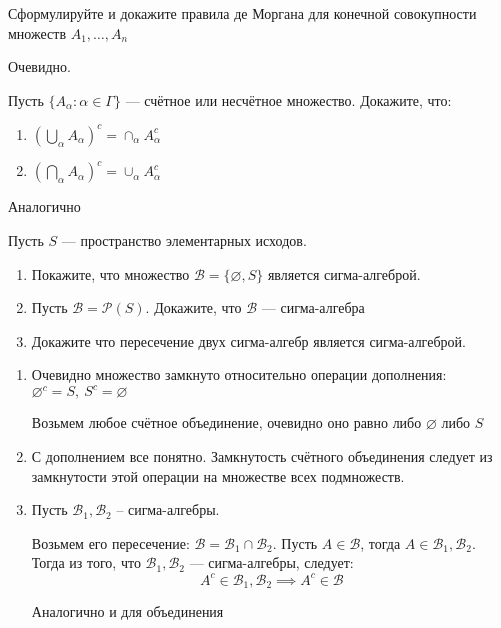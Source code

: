 \documentclass[document]{subfiles}
\begin{document}
\begin{problem}
    Сформулируйте и докажите правила де Моргана для конечной совокупности множеств $A_1, \dots, A_n$
\end{problem}
\begin{solution}
    Очевидно.
\end{solution}

\begin{problem}
    Пусть $\{A_\alpha : \alpha \in \Gamma\}$ --- счётное или несчётное множество. Докажите, что:
    \begin{enumerate}
        \item $(\bigcup_\alpha A_\alpha)^c = \cap_\alpha A^c_\alpha$
        \item $(\bigcap_\alpha A_\alpha)^c = \cup_\alpha A^c_\alpha$
    \end{enumerate}
\end{problem}
\begin{solution}
    Аналогично
\end{solution}

\begin{problem}
    Пусть $S$ --- пространство элементарных исходов.
    \begin{enumerate}
        \item Покажите, что множество $\mathcal{B} = \{\varnothing, S\}$ является сигма-алгеброй.
        \item Пусть $\mathcal{B} = \mathcal{P}(S)$. Докажите, что $\mathcal{B}$ --- сигма-алгебра
        \item Докажите что пересечение двух сигма-алгебр является сигма-алгеброй.
    \end{enumerate}
\end{problem}
\begin{solution}
    \begin{enumerate}
          \item Очевидно множество замкнуто относительно операции дополнения: $\varnothing^c = S, ~ S^c = \varnothing$ 
               
              Возьмем любое счётное объединение, очевидно оно равно либо $\varnothing$ либо $S$

          \item С дополнением все понятно. Замкнутость счётного объединения следует из замкнутости этой операции на множестве всех подмножеств.

          \item Пусть $\mathcal{B}_1, \mathcal{B}_2$ -- сигма-алгебры. 

              Возьмем его пересечение: $\mathcal{B} = \mathcal{B}_1 \cap \mathcal{B}_2$.
              Пусть $A \in \mathcal{B}$, тогда ${A \in \mathcal{B}_1, \mathcal{B}_2}$. Тогда из того, что $\mathcal{B}_1, \mathcal{B}_2$ --- сигма-алгебры, следует:
            \[A^c \in \mathcal{B}_1, \mathcal{B}_2 \implies A^c \in \mathcal{B}\]

            Аналогично и для объединения

    \end{enumerate}
\end{solution}
\end{document}
